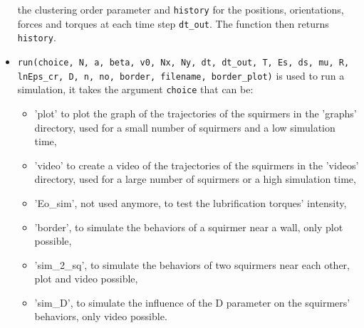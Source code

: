 \documentclass{article}
\begin{document}
\begin{itemize}
   the clustering order parameter and \texttt{history} for the positions, orientations,
   forces and torques at each time step \texttt{dt\_out}. The function then returns \texttt{history}.
   \item \texttt{run(choice, N, a, beta, v0, Nx, Ny, dt, dt\_out, T, Es, ds, mu, R, lnEps\_cr, D, n, no, border, filename, border\_plot)}
   is used to run a simulation, it takes the argument \texttt{choice} that can be:
   \begin{itemize}
    \item 'plot' to plot the graph of the trajectories of the squirmers in the 'graphs' directory, used for a small number of squirmers and a low simulation time,
    \item 'video' to create a video of the trajectories of the squirmers in the 'videos' directory, used for a large number of squirmers or a high simulation time,
    \item 'Eo\_sim', not used anymore, to test the lubrification torques' intensity,
    \item 'border', to simulate the behaviors of a squirmer near a wall, only plot possible,
    \item 'sim\_2\_sq', to simulate the behaviors of two squirmers near each other, plot and video possible,
    \item 'sim\_D', to simulate the influence of the D parameter on the squirmers' behaviors, only video possible.
   \end{itemize}
\end{itemize}
\end{document}
